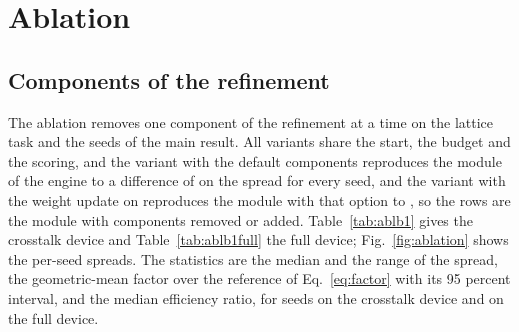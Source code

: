 \section{Ablation}\label{sec:ablation}

\subsection{Components of the refinement}

The ablation removes one component of the refinement at a time on the lattice task and the seeds of the main result. All variants share the start, the budget and the scoring, and the variant with the default components reproduces the module of the engine to a difference of \ablBCheck{} on the spread for every seed, and the variant with the weight update on reproduces the module with that option to \ablBWeightsCheck{}, so the rows are the module with components removed or added. Table~\ref{tab:ablb1} gives the crosstalk device and Table~\ref{tab:ablb1full} the full device; Fig.~\ref{fig:ablation} shows the per-seed spreads. The statistics are the median and the
range of the spread, the geometric-mean factor over the reference of Eq.~\ref{eq:factor} with its 95 percent interval, and the median efficiency ratio, for \ablBN{} seeds on the crosstalk device and \ablBFN{} on the full device.

\begin{table}[t]
\centering\small
\caption{Ablation of the refinement on the crosstalk device, $10\times10$ lattice task, \ablBN{} seeds. Each row removes one component, adds the weight update or changes one parameter; $\sigma$ is the relative standard deviation on the device, the factor is the geometric mean over the better of the two phase-fixed baseline runs with its 95 percent interval, and the last column is the median ratio of the efficiencies.}
\label{tab:ablb1}
\resizebox{\textwidth}{!}{}
\end{table}

\begin{table}[t]
\centering\small
\caption{Ablation of the refinement on the full device ($\parBits$-bit phase, crosstalk, fill factor \parFill{}), \ablBFN{} seeds, same task and statistics as Table~\ref{tab:ablb1} for the components that matter; the intervals use only five seeds and are wide.}
\label{tab:ablb1full}
\resizebox{\textwidth}{!}{}
\end{table}

